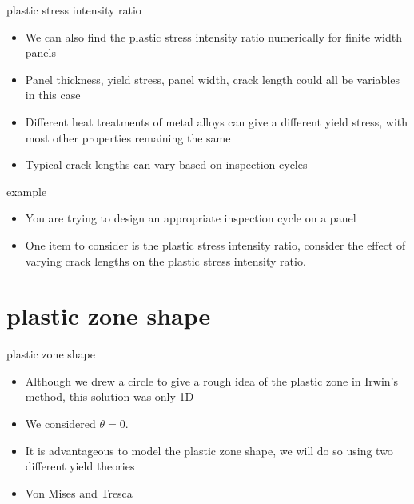 \documentclass[10pt,handout]{beamer}
\begin{document}
\begin{frame}{plastic stress intensity ratio}
	\begin{itemize}
		\item We can also find the plastic stress intensity ratio numerically for finite width panels
		\item Panel thickness, yield stress, panel width, crack length could all be variables in this case
		\item Different heat treatments of metal alloys can give a different yield stress, with most other properties remaining the same
		\item Typical crack lengths can vary based on inspection cycles
	\end{itemize}
\end{frame}

\begin{frame}{example}
	\begin{itemize}
		\item You are trying to design an appropriate inspection cycle on a panel
		\item One item to consider is the plastic stress intensity ratio, consider the effect of varying crack lengths on the plastic stress intensity ratio.
		\begin{figure}[H]
			\centering
		\end{figure}
	\end{itemize}
\end{frame}

\section{plastic zone shape}

\begin{frame}{plastic zone shape}
\begin{itemize}
\item Although we drew a circle to give a rough idea of the plastic zone in Irwin's method, this solution was only 1D
\item We considered $\theta=0$.
\item It is advantageous to model the plastic zone shape, we will do so using two different yield theories
\item Von Mises and Tresca
\end{itemize}
\end{frame}
\end{document}
